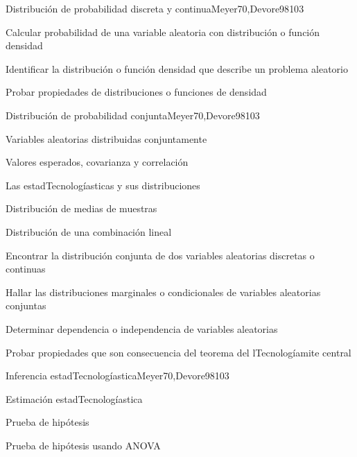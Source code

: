 \begin{syllabus}
\begin{unit}{Distribución de probabilidad discreta y continua}{}{Meyer70,Devore98}{10}{3}
   \begin{learningoutcomes}
      \item Calcular probabilidad de una variable aleatoria con distribución o función densidad
      \item Identificar la distribución o función densidad que describe un problema aleatorio
      \item Probar propiedades de distribuciones o funciones de densidad
   \end{learningoutcomes}
\end{unit}

\begin{unit}{Distribución de probabilidad conjunta}{}{Meyer70,Devore98}{10}{3}
\begin{topics}
      \item Variables aleatorias distribuidas conjuntamente
      \item Valores esperados, covarianza y correlación
      \item Las estadTecnologíasticas y sus distribuciones
      \item Distribución de medias de muestras
      \item Distribución de una combinación lineal

   \end{topics}
   \begin{learningoutcomes}
      \item Encontrar la distribución conjunta de dos variables aleatorias discretas o continuas
      \item Hallar las distribuciones marginales o condicionales de variables aleatorias conjuntas
      \item Determinar dependencia o independencia de variables aleatorias
      \item Probar propiedades que son consecuencia del teorema  del lTecnologíamite central
   \end{learningoutcomes}
\end{unit}

\begin{unit}{Inferencia estadTecnologíastica}{}{Meyer70,Devore98}{10}{3}
\begin{topics}
      \item Estimación estadTecnologíastica
      \item Prueba de hipótesis
      \item Prueba de hipótesis usando ANOVA
   \end{topics}


\end{unit}
\end{syllabus}
